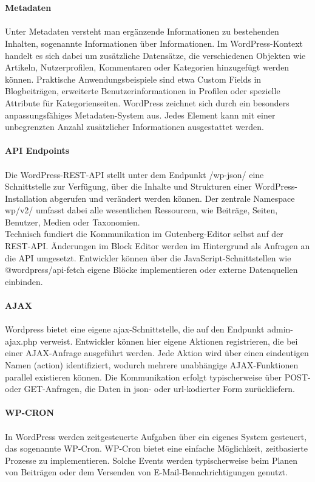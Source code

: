 \\
\\
\textbf{Metadaten}\\\\
Unter Metadaten versteht man ergänzende Informationen zu bestehenden Inhalten, sogenannte \grqq{}Informationen über Informationen\grqq{}.
Im WordPress-Kontext handelt es sich dabei um zusätzliche Datensätze, die verschiedenen Objekten wie Artikeln, Nutzerprofilen, Kommentaren oder Kategorien hinzugefügt werden können.
Praktische Anwendungsbeispiele sind etwa Custom Fields in Blogbeiträgen, erweiterte Benutzerinformationen in Profilen oder spezielle Attribute für Kategorienseiten.
WordPress zeichnet sich durch ein besonders anpassungsfähiges Metadaten-System aus.
Jedes Element kann mit einer unbegrenzten Anzahl zusätzlicher Informationen ausgestattet werden.
\\
\\
\textbf{API Endpoints}\\\\
Die WordPress-REST-API stellt unter dem Endpunkt /wp-json/ eine Schnittstelle zur Verfügung, über die Inhalte und Strukturen einer WordPress-Installation abgerufen und verändert werden können.
Der zentrale Namespace wp/v2/ umfasst dabei alle wesentlichen Ressourcen, wie Beiträge, Seiten, Benutzer, Medien oder Taxonomien.
\\
Technisch fundiert die Kommunikation im Gutenberg-Editor selbst auf der REST-API.
Änderungen im Block Editor werden im Hintergrund als Anfragen an die API umgesetzt.
Entwickler können über die JavaScript-Schnittstellen wie @wordpress/api-fetch eigene Blöcke implementieren oder externe Datenquellen einbinden.
\\
\\
\textbf{AJAX}\\\\
Wordpress bietet eine eigene \gls{ajax}-Schnittstelle, die auf den Endpunkt admin-ajax.php verweist.
Entwickler können hier eigene Aktionen registrieren, die bei einer AJAX-Anfrage ausgeführt werden.
Jede Aktion wird über einen eindeutigen Namen (action) identifiziert, wodurch mehrere unabhängige AJAX-Funktionen parallel existieren können.
Die Kommunikation erfolgt typischerweise über POST- oder GET-Anfragen, die Daten in \gls{json}- oder \gls{url}-kodierter Form zurückliefern.
\\
\\
\textbf{WP-CRON}\\\\
In WordPress werden zeitgesteuerte Aufgaben über ein eigenes System gesteuert, das sogenannte WP-Cron.
WP-Cron bietet eine einfache Möglichkeit, zeitbasierte Prozesse zu implementieren.
Solche Events werden typischerweise beim Planen von Beiträgen oder dem Versenden von E-Mail-Benachrichtigungen genutzt.

